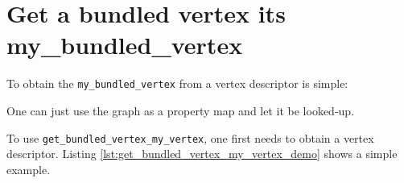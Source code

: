 

\section{Get a bundled vertex its my\_bundled\_vertex}
\label{subsec:get_bundled_vertex_my_vertex}

To obtain the \verb;my_bundled_vertex; from a vertex descriptor is simple:



One can just use the graph as a property map and let it be looked-up.

To use \verb;get_bundled_vertex_my_vertex;, 
one first needs to obtain a vertex descriptor.
Listing \ref{lst:get_bundled_vertex_my_vertex_demo}
shows a simple example.



